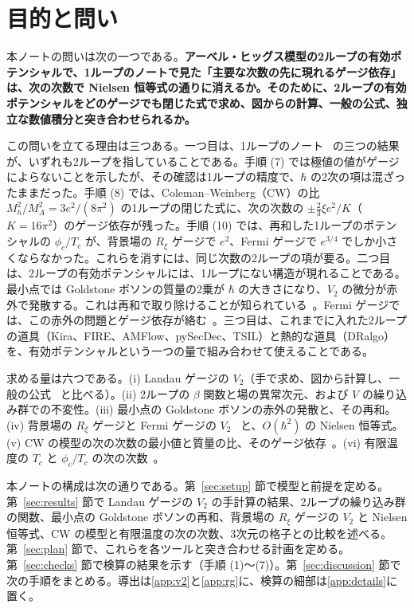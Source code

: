 \documentclass[a4paper,10pt]{ltjsarticle}
\begin{document}
\tableofcontents

\section{目的と問い}\label{sec:intro}

本ノートの問いは次の一つである。\textbf{アーベル・ヒッグス模型の2ループの有効ポテンシャルで、1ループのノートで見た「主要な次数の先に現れるゲージ依存」は、次の次数で Nielsen 恒等式の通りに消えるか。そのために、2ループの有効ポテンシャルをどのゲージでも閉じた式で求め、図からの計算、一般の公式、独立な数値積分と突き合わせられるか。}

この問いを立てる理由は三つある。一つ目は、1ループのノート~\cite{ahnote} の三つの結果が、いずれも2ループを指していることである。手順 (7) では極値の値がゲージによらないことを示したが、その確認は1ループの精度で、$\hbar$ の2次の項は混ざったままだった。手順 (8) では、Coleman--Weinberg（CW）の比 $M_h^2/M_A^2=3e^2/(8\pi^2)$ の1ループの閉じた式に、次の次数の $\pm\frac23\xi e^2/K$（$K=16\pi^2$）のゲージ依存が残った。手順 (10) では、再和した1ループのポテンシャルの $\phi_c/T_c$ が、背景場の $R_\xi$ ゲージで $e^2$、Fermi ゲージで $e^{3/4}$ でしか小さくならなかった。これらを消すには、同じ次数の2ループの項が要る。二つ目は、2ループの有効ポテンシャルには、1ループにない構造が現れることである。最小点では Goldstone ボソンの質量の2乗が $\hbar$ の大きさになり、$V_2$ の微分が赤外で発散する。これは再和で取り除けることが知られている~\cite{martin14,eek14}。Fermi ゲージでは、この赤外の問題とゲージ依存が絡む~\cite{egk16}。三つ目は、これまでに入れた2ループの道具（Kira、FIRE、AMFlow、pySecDec、TSIL）と熱的な道具（DRalgo）を、有効ポテンシャルという一つの量で組み合わせて使えることである。

求める量は六つである。(i) Landau ゲージの $V_2$（手で求め、図から計算し、一般の公式~\cite{martin01} と比べる）。(ii) 2ループの $\beta$ 関数と場の異常次元、および $V$ の繰り込み群での不変性。(iii) 最小点の Goldstone ボソンの赤外の発散と、その再和。(iv) 背景場の $R_\xi$ ゲージと Fermi ゲージの $V_2$~\cite{mp18} と、$O(\hbar^2)$ の Nielsen 恒等式。(v) CW の模型の次の次数の最小値と質量の比、そのゲージ依存~\cite{afs15}。(vi) 有限温度の $T_c$ と $\phi_c/T_c$ の次の次数~\cite{el20}。

本ノートの構成は次の通りである。第~\ref{sec:setup} 節で模型と前提を定める。第~\ref{sec:results} 節で Landau ゲージの $V_2$ の手計算の結果、2ループの繰り込み群の関数、最小点の Goldstone ボソンの再和、背景場の $R_\xi$ ゲージの $V_2$ と Nielsen 恒等式、CW の模型と有限温度の次の次数、3次元の格子との比較を述べる。第~\ref{sec:plan} 節で、これらを各ツールと突き合わせる計画を定める。第~\ref{sec:checks} 節で検算の結果を示す（手順 (1)〜(7)）。第~\ref{sec:discussion} 節で次の手順をまとめる。導出は\ref{app:v2}と\ref{app:rg}に、検算の細部は\ref{app:details}に置く。
\end{document}
